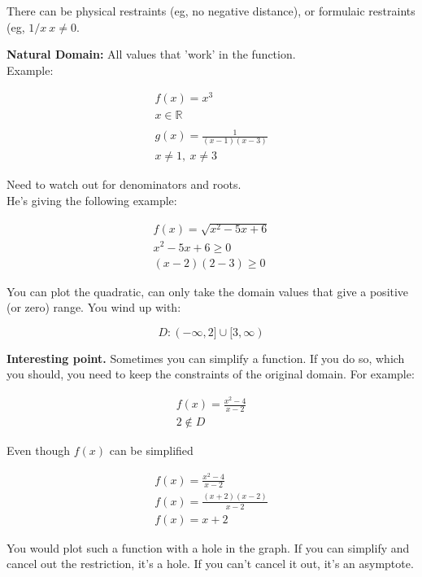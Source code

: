 \documentclass{article}
\begin{document}
There can be physical restraints (eg, no negative distance), or formulaic restraints (eg,
$1/x~x \neq 0$.

\textbf{Natural Domain:} All values that 'work' in the function.\\

Example:


\begin{align*}
f(x) = x^3\\
x \in \mathbb{R}\\
\\
g(x) = \frac{1}{(x-1)(x-3)}\\
x \neq 1,~x \neq 3
\end{align*}

Need to watch out for denominators and roots.\\

He's giving the following example:

\begin{align}
    f(x) = \sqrt{x^2 - 5x + 6}\\
    x^2 - 5x + 6 \geq 0\\
    (x-2)(2-3) \geq 0
\end{align}

You can plot the quadratic, can only take the domain values that give a positive (or zero)
range. You wind up with:

\begin{equation}
    D: (-\infty, 2] \cup [3, \infty)
\end{equation}

\textbf{Interesting point.} Sometimes you can simplify a function. If you do so, which you
should, you need to keep the constraints of the original domain. For example:

\begin{align}
    f(x) = \frac{x^2-4}{x-2}\\
    2 \notin D
\end{align}

Even though $f(x)$ can be simplified

\begin{align}
    f(x) = \frac{x^2 - 4}{x - 2}\\
    f(x) = \frac{(x + 2)(x - 2)}{x - 2}\\
    f(x) = x + 2
\end{align}

You would plot such a function with a hole in the graph. If you can simplify and cancel
out the restriction, it's a hole. If you can't cancel it out, it's an asymptote.\\
\end{document}
